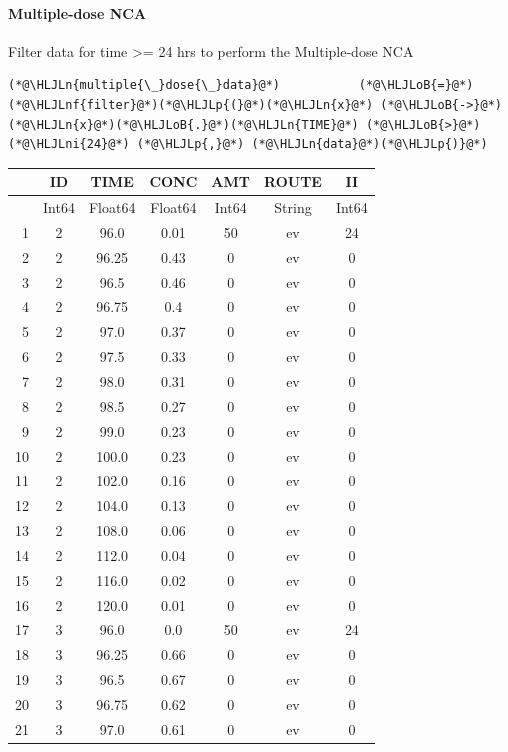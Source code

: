 \documentclass[12pt,a4paper]{article}
\newcommand{\HLJLn}[1]{#1}
\newcommand{\HLJLnf}[1]{\textcolor[RGB]{66,102,213}{#1}}
\newcommand{\HLJLni}[1]{\textcolor[RGB]{59,151,46}{#1}}
\newcommand{\HLJLoB}[1]{\textcolor[RGB]{102,102,102}{\textbf{#1}}}
\newcommand{\HLJLp}[1]{#1}
\begin{document}
\paragraph{Multiple-dose NCA}
Filter data for time >= 24 hrs to perform the Multiple-dose NCA


\begin{lstlisting}
(*@\HLJLn{multiple{\_}dose{\_}data}@*)           (*@\HLJLoB{=}@*) (*@\HLJLnf{filter}@*)(*@\HLJLp{(}@*)(*@\HLJLn{x}@*) (*@\HLJLoB{->}@*) (*@\HLJLn{x}@*)(*@\HLJLoB{.}@*)(*@\HLJLn{TIME}@*) (*@\HLJLoB{>}@*) (*@\HLJLni{24}@*) (*@\HLJLp{,}@*) (*@\HLJLn{data}@*)(*@\HLJLp{)}@*)
\end{lstlisting}


\begin{tabular}{r|cccccc}
	& ID & TIME & CONC & AMT & ROUTE & II\\
	\hline
	& Int64 & Float64 & Float64 & Int64 & String & Int64\\
	\hline
	1 & 2 & 96.0 & 0.01 & 50 & ev & 24 \\
	2 & 2 & 96.25 & 0.43 & 0 & ev & 0 \\
	3 & 2 & 96.5 & 0.46 & 0 & ev & 0 \\
	4 & 2 & 96.75 & 0.4 & 0 & ev & 0 \\
	5 & 2 & 97.0 & 0.37 & 0 & ev & 0 \\
	6 & 2 & 97.5 & 0.33 & 0 & ev & 0 \\
	7 & 2 & 98.0 & 0.31 & 0 & ev & 0 \\
	8 & 2 & 98.5 & 0.27 & 0 & ev & 0 \\
	9 & 2 & 99.0 & 0.23 & 0 & ev & 0 \\
	10 & 2 & 100.0 & 0.23 & 0 & ev & 0 \\
	11 & 2 & 102.0 & 0.16 & 0 & ev & 0 \\
	12 & 2 & 104.0 & 0.13 & 0 & ev & 0 \\
	13 & 2 & 108.0 & 0.06 & 0 & ev & 0 \\
	14 & 2 & 112.0 & 0.04 & 0 & ev & 0 \\
	15 & 2 & 116.0 & 0.02 & 0 & ev & 0 \\
	16 & 2 & 120.0 & 0.01 & 0 & ev & 0 \\
	17 & 3 & 96.0 & 0.0 & 50 & ev & 24 \\
	18 & 3 & 96.25 & 0.66 & 0 & ev & 0 \\
	19 & 3 & 96.5 & 0.67 & 0 & ev & 0 \\
	20 & 3 & 96.75 & 0.62 & 0 & ev & 0 \\
	21 & 3 & 97.0 & 0.61 & 0 & ev & 0 \\

\end{tabular}
\end{document}
